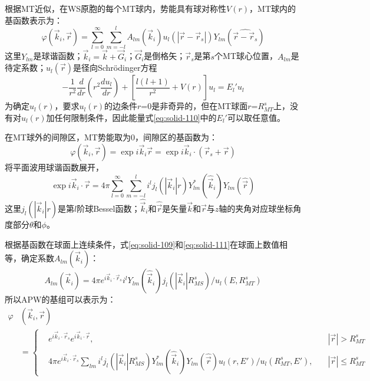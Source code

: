 根据MT近似，在WS原胞的每个MT球内，势能具有球对称性$V(r)$，MT球内的基函数表示为：
\begin{equation}
  \varphi(\vec k_i,\vec r)=\sum_{l=0}^{\infty}\sum_{m=-l}^lA_{lm}(\vec k_i)u_l(|\vec r-\vec r_s|)Y_{lm}(\widehat{\vec r-\vec r_s})
  \label{eq:solid-109}
\end{equation}
这里$Y_{lm}$是球谐函数；$\vec k_i=\vec k+\vec G_i$；$\vec G_i$是倒格矢；$\vec r_s$是第$s$个MT球心位置，$A_{lm}$是待定系数；$u_l(\vec r)$是径向Schr\"odinger方程
\begin{equation}
  -\frac1{r^2}\frac d{dr}\left(r^2\frac{du_l}{dr}\right)+\left[\frac{l(l+1)}{r^2}+V(r)\right]u_l=E_l'u_l
  \label{eq:solid-110}
\end{equation}
为确定$u_l(r)$，要求$u_l(r)$的边条件$r$=0是非奇异的，但在MT球面$r$=$R_{MT}^s$上，没有对$u_l(r)$加任何限制条件，因此能量式\eqref{eq:solid-110}中的$E_l'$可以取任意值。

在MT球外的间隙区，MT势能取为0，间隙区的基函数为：
\begin{equation}
  \varphi(\vec k_i,\vec r)=\exp i\vec k_i\vec r=\exp i\vec k_i\cdot(\vec r_s+\vec r)
  \label{eq:solid-111}
\end{equation}
将平面波用球谐函数展开，
\begin{equation}
  \exp i\vec k_i\cdot\vec r=4\pi\sum_{l=0}^{\infty}\sum_{m=-l}^li^lj_l(|\vec k_i|r)Y_{lm}^{\ast}(\hat{\vec k}_i)Y_{lm}(\hat{\vec r})
  \label{eq:solid-112}
\end{equation}
这里$j_l(|\vec k_i|r)$是第$l$阶球Bessel函数；$\hat{\vec k}_i$和$\hat{\vec r}$是矢量$\vec k$和$\vec r$与$z$轴的夹角对应球坐标角度部分$\theta$和$\phi$。

根据基函数在球面上连续条件，式\eqref{eq:solid-109}和\eqref{eq:solid-111}在球面上数值相等，确定系数$A_{lm}(\vec k_i)$：
$$A_{lm}(\vec k_i)=4\pi e^{i\vec k_i\cdot\vec r_s}i^lY_{lm}(\hat{\vec k}_i)j_l(|\vec k_i|R_{MS}^s)/u_l(E,R_{MT}^s)$$
所以APW的基组可以表示为：
\begin{equation}
  \begin{split}
    \varphi&(\vec k_i,\vec r)\\
    &=\left\{\begin{aligned}
    &e^{i\vec k_i\cdot\vec r_s}e^{i\vec k_i\cdot\vec r},&|\vec r|>R_{MT}^s\\
    &4\pi e^{i\vec k_i\cdot\vec r_s}\sum_{lm}i^lj_l(|\vec k_i|R_{MS}^s)Y_{lm}^{\ast}(\hat{\vec k}_i)Y_{lm}(\hat{\vec r})u_l(r,E')/u_l(R_{MT}^s,E'),\quad&|\vec r|\leqslant R_{MT}^s
    \end{aligned} \right.
  \end{split}
  \label{eq:solid-113}
\end{equation}

